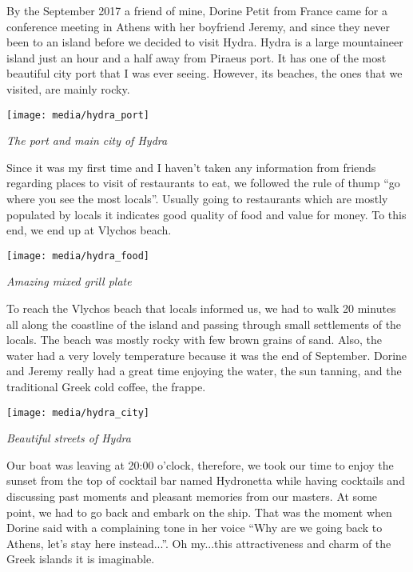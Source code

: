 \documentclass[10pt,a4paper]{article} %
\begin{document}
\begin{multicols}{3}
By the September 2017 a friend of mine, Dorine Petit from France
came for a conference meeting in Athens with her boyfriend Jeremy,
and since they never been to an island before we decided to visit Hydra. 
Hydra is a large mountaineer island just an hour and a half away from Piraeus port. 
It has one of the most beautiful city port that I was ever seeing. 
However, its beaches, the ones that we visited, are mainly rocky.  

\begin{center}
	\texttt{[image: media/hydra\_port]}
	\par\textit{The port and main city of Hydra}
\end{center}

Since it was my first time and I haven't taken any information from friends 
regarding places to visit of restaurants to eat, we followed the rule of thump 
``go where you see the most locals''. 
Usually going to restaurants which are mostly populated by locals it indicates 
good quality of food and value for money. 
To this end, we end up at Vlychos beach.

\begin{center}
	\texttt{[image: media/hydra\_food]}
	\par\textit{Amazing mixed grill plate}
\end{center}

To reach the Vlychos beach that locals informed us, 
we had to walk 20 minutes all along the coastline of the island
and passing through small settlements of the locals. 
The beach was mostly rocky with few brown grains of sand. 
Also, the water had a very lovely temperature because it was the end of September. 
Dorine and Jeremy really had a great time enjoying the water, the sun tanning, 
and the traditional Greek cold coffee, the frappe. 

\begin{center}
	\texttt{[image: media/hydra\_city]}
	\par\textit{Beautiful streets of Hydra}
\end{center}

Our boat was leaving at 20:00 o'clock, therefore,
we took our time to enjoy the sunset from the top of cocktail bar named Hydronetta
while having cocktails and discussing past moments and pleasant memories from our masters. 
At some point, we had to go back and embark on the ship. 
That was the moment when Dorine said with a complaining tone in her voice 
``Why are we going back to Athens, let's stay here instead...''. 
Oh my...this attractiveness and charm of the Greek islands it is imaginable.


\end{multicols}
\end{document}
